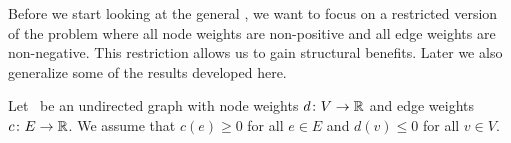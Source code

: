 Before we start looking at the general \WSP, we want to focus on a restricted version of the problem where all node weights are non-positive and all edge weights are non-negative. This restriction allows us to gain structural benefits. Later we also generalize some of the results developed here.

\begin{assumption}
	\label{assumption:wsprestricted}
	Let \ugraph\ be an undirected graph with node weights $d\colon V \to \mathbb{R}$ and edge weights $c\colon E \to \mathbb{R}$. We assume that $c(e) \geq 0$ for all $e \in E$ and $d(v) \leq 0$ for all $v \in V$.
\end{assumption}

\begin{figure}[H]
	\begin{minipage}[t]{\linewidth}
		\centering
\end{minipage}
\end{figure}
